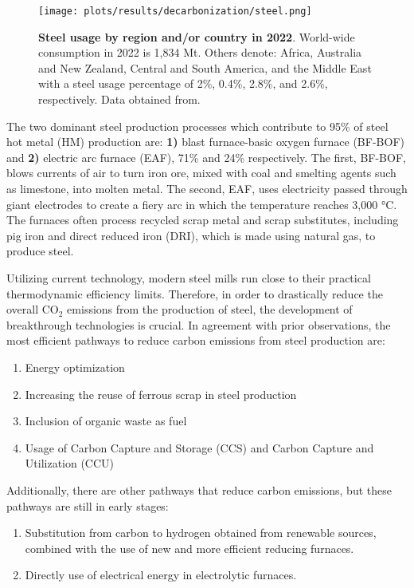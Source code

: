 \begin{figure}[ht!]
  \centering
  \texttt{[image: plots/results/decarbonization/steel.png]}
  \caption[Steel usage by region and/or country in 2022]{\textbf{Steel usage by region and/or country in 2022}. World-wide consumption in 2022 is 1,834 Mt. Others denote: Africa, Australia and New Zealand, Central and South America, and the Middle East with a steel usage percentage of 2\%, 0.4\%, 2.8\%, and 2.6\%, respectively. Data obtained from.\autocite{worldsteel2022world}}
  \label{fig:steel}
\end{figure}


The two dominant steel production processes which contribute to 95\% of steel hot metal (HM) production are: \textbf{1)} blast furnace-basic oxygen furnace (BF-BOF) and \textbf{2)} electric arc furnace (EAF), 71\% and 24\% respectively.\autocite{fan2021low} The first, BF-BOF, blows currents of air to turn iron ore, mixed with coal and smelting agents such as limestone, into molten metal. The second, EAF, uses electricity passed through giant electrodes to create a fiery arc in which the temperature reaches 3,000 °C. The furnaces often process recycled scrap metal and scrap substitutes, including pig iron and direct reduced iron (DRI), which is made using natural gas, to produce steel.\autocite{mckinsey_2020}

Utilizing current technology, modern steel mills run close to their practical thermodynamic efficiency limits. Therefore, in order to drastically reduce the overall CO$_2$ emissions from the production of steel, the development of breakthrough technologies is crucial.\autocite{rissman2020technologies} In agreement with prior observations,\autocite{aus_2022} the most efficient pathways to reduce carbon emissions from steel production are: 

\begin{enumerate}
\item Energy optimization
\item Increasing the reuse of ferrous scrap in steel production 
\item Inclusion of organic waste as fuel
\item Usage of Carbon Capture and Storage (CCS) and Carbon Capture and Utilization (CCU) 
\end{enumerate}

Additionally, there are other pathways that reduce carbon emissions, but these pathways are still in early stages:

\begin{enumerate}
\item Substitution from carbon to hydrogen obtained from renewable sources, combined with the use of new and more efficient reducing furnaces.
\item Directly use of electrical energy in electrolytic furnaces.
\end{enumerate}

